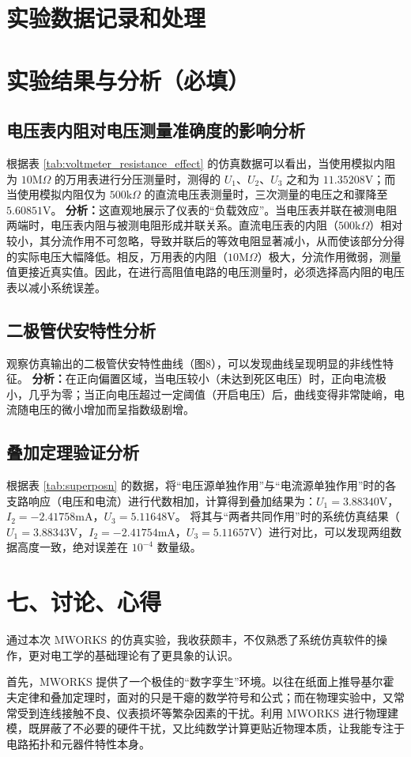 ﻿\documentclass[10.5pt]{config}
\begin{document}
\section{实验数据记录和处理}

\section{实验结果与分析（必填）}

\subsection{电压表内阻对电压测量准确度的影响分析}
根据表 \ref{tab:voltmeter_resistance_effect} 的仿真数据可以看出，当使用模拟内阻为 $10\mathrm{M}\Omega$ 的万用表进行分压测量时，测得的 $U_1$、$U_2$、$U_3$ 之和为 $11.35208\mathrm{V}$；而当使用模拟内阻仅为 $500\mathrm{k}\Omega$ 的直流电压表测量时，三次测量的电压之和骤降至 $5.60851\mathrm{V}$。
\textbf{分析：}这直观地展示了仪表的“负载效应”。当电压表并联在被测电阻两端时，电压表内阻与被测电阻形成并联关系。直流电压表的内阻（$500\mathrm{k}\Omega$）相对较小，其分流作用不可忽略，导致并联后的等效电阻显著减小，从而使该部分分得的实际电压大幅降低。相反，万用表的内阻（$10\mathrm{M}\Omega$）极大，分流作用微弱，测量值更接近真实值。因此，在进行高阻值电路的电压测量时，必须选择高内阻的电压表以减小系统误差。

\subsection{二极管伏安特性分析}
观察仿真输出的二极管伏安特性曲线（图8），可以发现曲线呈现明显的非线性特征。
\textbf{分析：}在正向偏置区域，当电压较小（未达到死区电压）时，正向电流极小，几乎为零；当正向电压超过一定阈值（开启电压）后，曲线变得非常陡峭，电流随电压的微小增加而呈指数级剧增。

\subsection{叠加定理验证分析}
根据表 \ref{tab:superposn} 的数据，将“电压源单独作用”与“电流源单独作用”时的各支路响应（电压和电流）进行代数相加，计算得到叠加结果为：$U_1 = 3.88340\mathrm{V}$，$I_2 = -2.41758\mathrm{mA}$，$U_3 = 5.11648\mathrm{V}$。
将其与“两者共同作用”时的系统仿真结果（$U_1 = 3.88343\mathrm{V}$，$I_2 = -2.41754\mathrm{mA}$，$U_3 = 5.11657\mathrm{V}$）进行对比，可以发现两组数据高度一致，绝对误差在 $10^{-4}$ 数量级。

\section*{七、讨论、心得}

通过本次 MWORKS 的仿真实验，我收获颇丰，不仅熟悉了系统仿真软件的操作，更对电工学的基础理论有了更具象的认识。

首先，MWORKS 提供了一个极佳的“数字孪生”环境。以往在纸面上推导基尔霍夫定律和叠加定理时，面对的只是干瘪的数学符号和公式；而在物理实验中，又常常受到连线接触不良、仪表损坏等繁杂因素的干扰。利用 MWORKS 进行物理建模，既屏蔽了不必要的硬件干扰，又比纯数学计算更贴近物理本质，让我能专注于电路拓扑和元器件特性本身。
\end{document}
